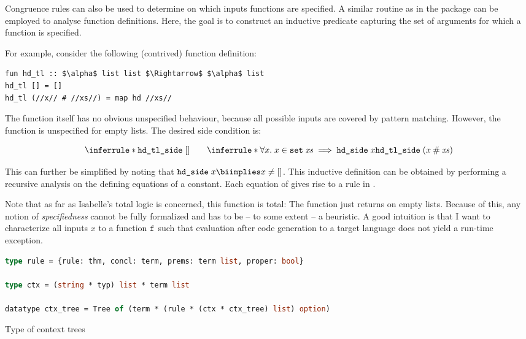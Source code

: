 Congruence rules can also be used to determine on which inputs functions are specified.
A similar routine as in the  package can be employed to analyse function definitions.
Here, the goal is to construct an inductive predicate capturing the set of arguments for which a function is specified.

For example, consider the following (contrived) function definition:
\begin{lstlisting}[language=Isabelle]
fun hd_tl :: $\alpha$ list list $\Rightarrow$ $\alpha$ list
hd_tl [] = []
hd_tl (//x// # //xs//) = map hd //xs//
\end{lstlisting}

\noindent
The function itself has no obvious unspecified behaviour, because all possible inputs are covered by pattern matching.
However, the function  is unspecified for empty lists.
The desired side condition is:

\[
  \inferrule*{
  }{\holconst{hd\_tl\_side}\;[]}\qquad
  \inferrule*{
    \forall x.\;x \in \holconst{set}\;\mathit{xs} \implies \holconst{hd\_side}\;x
  }{\holconst{hd\_tl\_side}\;(x \cons \mathit{xs})}
\]

\noindent
This can further be simplified by noting that $\holconst{hd\_side}\;x \biimplies x \neq []$.
This inductive definition can be obtained by performing a recursive analysis on the defining equations of a constant.
Each equation of  gives rise to a rule in .

Note that as far as Isabelle's total logic is concerned, this function is total:
The  function just returns  on empty lists.
Because of this, any notion of \emph{specifiedness} cannot be fully formalized and has to be -- to some extent -- a heuristic.
A good intuition is that I want to characterize all inputs $x$ to a function $\texttt{\textup{f}}$ such that evaluation after code generation to a target language does not yield a run-time exception.

\begin{code}[t]
  \begin{lstlisting}[language=ML]
type rule = {rule: thm, concl: term, prems: term list, proper: bool}

type ctx = (string * typ) list * term list

datatype ctx_tree = Tree of (term * (rule * (ctx * ctx_tree) list) option)
  \end{lstlisting}
  \caption{Type of context trees}
  \label{code:preproc:ctxtree}
\end{code}

